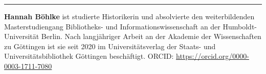 \begin{center}\rule{0.5\linewidth}{0.5pt}\end{center}

\textbf{Hannah Böhlke} ist studierte Historikerin und absolvierte den weiterbildenden Masterstudiengang Bibliotheks- und Informationswissenschaft an der Humboldt-Universität Berlin. Nach langjähriger Arbeit an der Akademie der Wissenschaften zu Göttingen ist sie seit 2020 im Universitätsverlag der Staats- und Universitätsbibliothek Göttingen beschäftigt. ORCID: \url{https://orcid.org/0000-0003-1711-7080}
